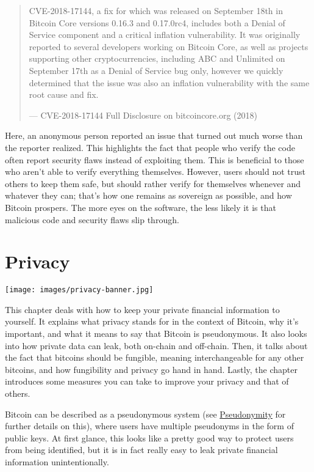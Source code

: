 \begin{quote}
CVE-2018-17144, a fix for which was released on September 18th in
Bitcoin Core versions 0.16.3 and 0.17.0rc4, includes both a Denial of
Service component and a critical inflation vulnerability. It was
originally reported to several developers working on Bitcoin Core, as
well as projects supporting other cryptocurrencies, including ABC and
Unlimited on September 17th as a Denial of Service bug only, however we
quickly determined that the issue was also an inflation vulnerability
with the same root cause and fix.

---  CVE-2018-17144 Full Disclosure on bitcoincore.org (2018)
\end{quote}

Here, an anonymous person reported an issue that turned out much worse
than the reporter realized. This highlights the fact that people who
verify the code often report security flaws instead of exploiting them.
This is beneficial to those who aren't able to verify everything
themselves. However, users should not trust others to keep them safe,
but should rather verify for themselves whenever and whatever they can;
that's how one remains as sovereign as possible, and how Bitcoin
prospers. The more eyes on the software, the less likely it is that
malicious code and security flaws slip through.

\hypertarget{privacy}{%
\section{Privacy}\label{privacy}}

\texttt{[image: images/privacy-banner.jpg]}

This chapter deals with how to keep your private financial information
to yourself. It explains what privacy stands for in the context of
Bitcoin, why it's important, and what it means to say that Bitcoin is
pseudonymous. It also looks into how private data can leak, both
on-chain and off-chain. Then, it talks about the fact that bitcoins
should be fungible, meaning interchangeable for any other bitcoins, and
how fungibility and privacy go hand in hand. Lastly, the chapter
introduces some measures you can take to improve your privacy and that
of others.

Bitcoin can be described as a pseudonymous system (see
\protect\hyperlink{pseudonymity}{Pseudonymity} for further details on
this), where users have multiple pseudonyms in the form of public keys.
At first glance, this looks like a pretty good way to protect users from
being identified, but it is in fact really easy to leak private
financial information unintentionally.

